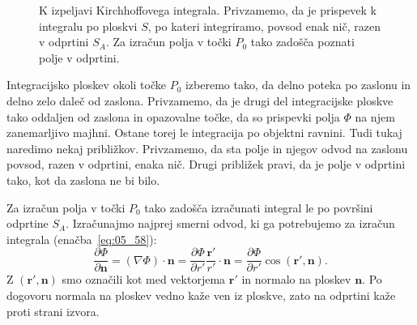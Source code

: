 \begin{figure}[ht]
\centering
\def\svgwidth{80truemm} 

\caption{K izpeljavi Kirchhoffovega integrala. Privzamemo, da je prispevek k integralu po 
ploskvi $S$, po kateri integriramo, povsod enak nič, razen v odprtini $S_A$. Za izračun
polja v točki $P_0$ tako zadošča poznati polje v odprtini.}
\label{fig:05_Kirchhoff}
\end{figure}

Integracijsko ploskev okoli točke $P_0$ izberemo tako, da delno poteka po zaslonu
in delno zelo daleč od zaslona. Privzamemo, da je drugi del integracijske ploskve tako oddaljen
od zaslona in opazovalne točke, da so prispevki polja $\Phi$ na njem zanemarljivo majhni. 
Ostane torej le integracija po objektni ravnini. Tudi tukaj naredimo nekaj približkov.
Privzamemo, da sta polje in njegov odvod na zaslonu povsod, razen v odprtini, enaka nič. 
Drugi približek pravi, da je polje v odprtini tako, kot da zaslona ne bi bilo. 

Za izračun polja v točki $P_0$ tako zadošča izračunati integral le po površini odprtine $S_A$. 
Izračunajmo najprej smerni odvod, ki ga potrebujemo za izračun integrala (enačba~\ref{eq:05_58}):
\begin{equation}
\frac{\partial \Phi}{\partial \mathbf{n}} = (\nabla \Phi)\cdot \mathbf{n} = 
\frac{\partial \Phi}{\partial r'} \frac{\mathbf{r'}}{r'}\cdot \mathbf{n} = \frac{\partial \Phi}{\partial r'} 
\cos\left(\mathbf{r'},\mathbf{n}\right)\!.
\label{eq:05_59}
\end{equation}
Z $\left(\mathbf{r'},\mathbf{n}\right)$ smo označili kot med vektorjema $\mathbf{r}'$ in normalo
na ploskev $\mathbf{n}$. Po dogovoru normala na ploskev vedno kaže ven iz ploskve, zato
na odprtini kaže proti strani izvora. 

